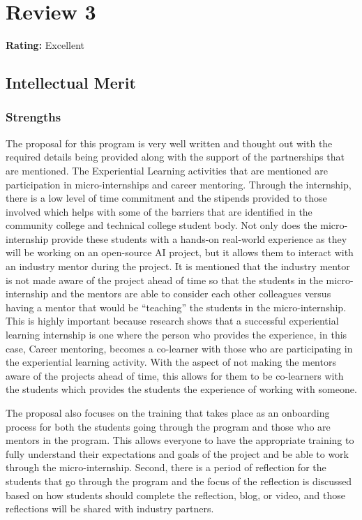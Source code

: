 \newpage
\section{Review 3}
\textbf{Rating:} Excellent

\subsection{Intellectual Merit} 

\subsubsection{Strengths}

The proposal for this program is very well written and thought out with the required details being provided along with the support of the partnerships that are mentioned. The Experiential Learning activities that are mentioned are participation in micro-internships and career mentoring. Through the internship, there is a low level of time commitment and the stipends provided to those involved which helps with some of the barriers that are identified in the community college and technical college student body. Not only does the micro-internship provide these students with a hands-on real-world experience as they will be working on an open-source AI project, but it allows them to interact with an industry mentor during the project. It is mentioned that the industry mentor is not made aware of the project ahead of time so that the students in the micro-internship and the mentors are able to consider each other colleagues versus having a mentor that would be “teaching” the students in the micro-internship. This is highly important because research shows that a successful experiential learning internship is one where the person who provides the experience, in this case, Career mentoring, becomes a co-learner with those who are participating in the experiential learning activity. With the aspect of not making the mentors aware of the projects ahead of time, this allows for them to be co-learners with the students which provides the students the experience of working with someone. 

The proposal also focuses on the training that takes place as an onboarding process for both the students going through the program and those who are mentors in the program. This allows everyone to have the appropriate training to fully understand their expectations and goals of the project and be able to work through the micro-internship. Second, there is a period of reflection for the students that go through the program and the focus of the reflection is discussed based on how students should complete the reflection, blog, or video, and those reflections will be shared with industry partners. 

